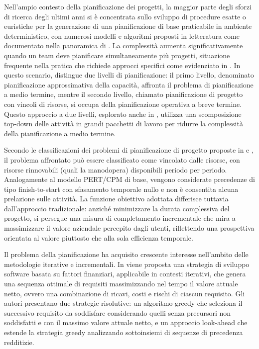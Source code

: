 \documentclass[12pt,a4paper,openright,twoside]{book}
\begin{document}
Nell'ampio contesto della pianificazione dei progetti, la maggior parte degli sforzi di ricerca degli ultimi anni si è concentrata sullo sviluppo di procedure esatte o euristiche per la generazione di una pianificazione di base praticabile in ambiente deterministico, con numerosi modelli e algoritmi proposti in letteratura come documentato nella panoramica di \cite{KOLISCH2001249}. La complessità aumenta significativamente quando un team deve pianificare simultaneamente più progetti, situazione frequente nella pratica che richiede approcci specifici come evidenziato in \cite{PLATJE1994100}. In questo scenario, \cite{de1998resource} distingue due livelli di pianificazione: il primo livello, denominato pianificazione approssimativa della capacità, affronta il problema di pianificazione a medio termine, mentre il secondo livello, chiamato pianificazione di progetto con vincoli di risorse, si occupa della pianificazione operativa a breve termine. Questo approccio a due livelli, esplorato anche in \cite{Gademann2005153}, utilizza una scomposizione top-down delle attività in grandi pacchetti di lavoro per ridurre la complessità della pianificazione a medio termine.

\vspace{1em}

Secondo le classificazioni dei problemi di pianificazione di progetto proposte in \cite{herroelen1999classification} e \cite{BRUCKER19993}, il problema affrontato può essere classificato come vincolato dalle risorse, con risorse rinnovabili (quali la manodopera) disponibili periodo per periodo. Analogamente al modello PERT/CPM di base, vengono considerate precedenze di tipo finish-to-start con sfasamento temporale nullo e non è consentita alcuna prelazione sulle attività. La funzione obiettivo adottata differisce tuttavia dall'approccio tradizionale: anziché minimizzare la durata complessiva del progetto, si persegue una misura di completamento incrementale che mira a massimizzare il valore aziendale percepito dagli utenti, riflettendo una prospettiva orientata al valore piuttosto che alla sola efficienza temporale.

\vspace{1em}

Il problema della pianificazione ha acquisito crescente interesse nell'ambito delle metodologie iterative e incrementali. In \cite{denne2003software} viene proposta una strategia di sviluppo software basata su fattori finanziari, applicabile in contesti iterativi, che genera una sequenza ottimale di requisiti massimizzando nel tempo il valore attuale netto, ovvero una combinazione di ricavi, costi e rischi di ciascun requisito. Gli autori presentano due strategie risolutive: un algoritmo greedy che seleziona il successivo requisito da soddisfare considerando quelli senza precursori non soddisfatti e con il massimo valore attuale netto, e un approccio look-ahead che estende la strategia greedy analizzando sottoinsiemi di sequenze di precedenza redditizie.
\end{document}

